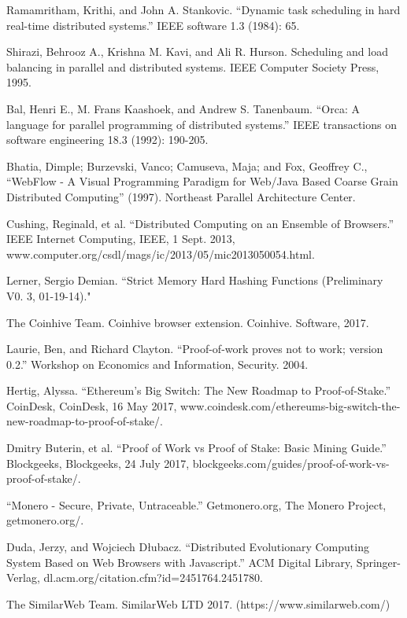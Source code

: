 \documentclass[runningheads]{llncs}
\begin{document}
\begin{thebibliography}{1}
Ramamritham, Krithi, and John A. Stankovic. ``Dynamic task scheduling in hard real-time distributed systems.'' IEEE software 1.3 (1984): 65.

Shirazi, Behrooz A., Krishna M. Kavi, and Ali R. Hurson. Scheduling and load balancing in parallel and distributed systems. IEEE Computer Society Press, 1995.

Bal, Henri E., M. Frans Kaashoek, and Andrew S. Tanenbaum. ``Orca: A language for parallel programming of distributed systems.'' IEEE transactions on software engineering 18.3 (1992): 190-205.

Bhatia, Dimple; Burzevski, Vanco; Camuseva, Maja; and Fox, Geoffrey C., ``WebFlow - A Visual Programming Paradigm for Web/Java Based Coarse Grain Distributed Computing'' (1997).
Northeast Parallel Architecture Center.

 Cushing, Reginald, et al. ``Distributed Computing on an Ensemble of Browsers.'' IEEE Internet Computing, IEEE, 1 Sept. 2013, www.computer.org/csdl/mags/ic/2013/05/mic2013050054.html.

 Lerner, Sergio Demian. ``Strict Memory Hard Hashing Functions (Preliminary V0. 3, 01-19-14)."

The Coinhive Team. Coinhive browser extension. Coinhive. Software, 2017.

Laurie, Ben, and Richard Clayton. ``Proof-of-work proves not to work; version 0.2.'' Workshop on Economics and Information, Security. 2004.

Hertig, Alyssa. ``Ethereum's Big Switch: The New Roadmap to Proof-of-Stake.'' CoinDesk, CoinDesk, 16 May 2017, www.coindesk.com/ethereums-big-switch-the-new-roadmap-to-proof-of-stake/. 

Dmitry Buterin, et al. ``Proof of Work vs Proof of Stake: Basic Mining Guide.'' Blockgeeks, Blockgeeks, 24 July 2017, blockgeeks.com/guides/proof-of-work-vs-proof-of-stake/. 

 ``Monero - Secure, Private, Untraceable.'' Getmonero.org, The Monero Project, getmonero.org/.

 Duda, Jerzy, and Wojciech Dłubacz. ``Distributed Evolutionary Computing System Based on Web Browsers with Javascript.'' ACM Digital Library, Springer-Verlag, dl.acm.org/citation.cfm?id=2451764.2451780.

 The SimilarWeb Team. SimilarWeb LTD 2017. (https://www.similarweb.com/)


\end{thebibliography}
\end{document}
